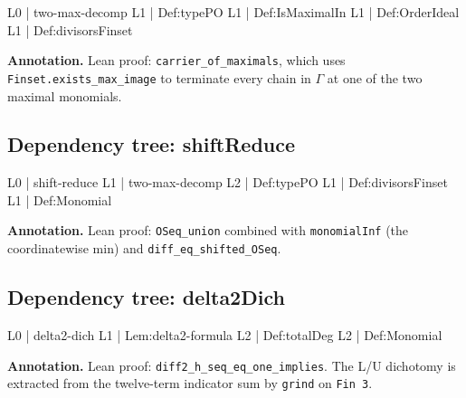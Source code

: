\documentclass[11pt,reqno]{amsart}
\begin{document}
\noindent%
\begin{minipage}[t]{0.48\linewidth}
	\vspace{0pt}
	\begin{verbatimbox}
		L0 | two-max-decomp
		L1 |   Def:typePO
		L1 |   Def:IsMaximalIn
		L1 |   Def:OrderIdeal
		L1 |   Def:divisorsFinset
	\end{verbatimbox}
\end{minipage}\hfill 
\begin{minipage}[t]{0.48\linewidth}
	\vspace{0pt}
	\textbf{Annotation.} Lean proof: \texttt{carrier\_of\_maximals}, which uses \texttt{Finset.exists\_max\_image} to terminate every chain in $\Gamma$ at one of the two maximal monomials.
\end{minipage}

\medskip

\subsection*{Dependency tree: \textsf{shiftReduce}}

\noindent%
\begin{minipage}[t]{0.48\linewidth}
	\vspace{0pt}
	\begin{verbatimbox}
		L0 | shift-reduce
		L1 |   two-max-decomp
		L2 |     Def:typePO
		L1 |   Def:divisorsFinset
		L1 |   Def:Monomial
	\end{verbatimbox}
\end{minipage}\hfill 
\begin{minipage}[t]{0.48\linewidth}
	\vspace{0pt}
	\textbf{Annotation.} Lean proof: \texttt{OSeq\_union} combined with \texttt{monomialInf} (the coordinatewise min) and \texttt{diff\_eq\_shifted\_OSeq}.
\end{minipage}

\medskip

\subsection*{Dependency tree: \textsf{delta2Dich}}

\noindent%
\begin{minipage}[t]{0.48\linewidth}
	\vspace{0pt}
	\begin{verbatimbox}
		L0 | delta2-dich
		L1 |   Lem:delta2-formula
		L2 |     Def:totalDeg
		L2 |     Def:Monomial
	\end{verbatimbox}
\end{minipage}\hfill 
\begin{minipage}[t]{0.48\linewidth}
	\vspace{0pt}
	\textbf{Annotation.} Lean proof: \texttt{diff2\_h\_seq\_eq\_one\_implies}. The L/U dichotomy is extracted from the twelve-term indicator sum by \texttt{grind} on \texttt{Fin 3}.
\end{minipage}
\end{document}
